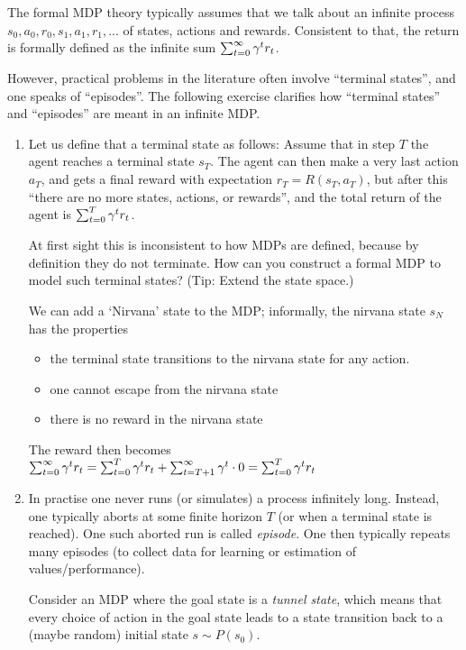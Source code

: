 The formal MDP theory typically assumes that we talk about an infinite process\\ $s_0,a_0,r_0,s_1,a_1,r_1,...$ of states, actions and rewards. Consistent to that, the return is formally defined as the infinite sum $\sum_{t=0}^\infty \gamma^t r_t$.

However, practical problems in the literature often involve ``terminal states'', and one speaks of ``episodes''. The following exercise clarifies how ``terminal states'' and ``episodes'' are meant in an infinite MDP.

\begin{enumerate}
\item Let us define that a terminal state as follows: Assume that in step $T$ the agent reaches a terminal state $s_T$. The agent can then make a very last action $a_T$, and gets a final reward with expectation $r_T = R(s_T, a_T)$, but after this ``there are no more states, actions, or rewards'', and the total return of the agent is $\sum_{t=0}^T \gamma^t r_t$.

At first sight this is inconsistent to how MDPs are defined, because by definition they do not terminate. How can you construct a formal MDP to model such terminal states? (Tip: Extend the state space.)

\begin{solution}
We can add a `Nirvana' state to the MDP; informally, the nirvana state $s_N$ has the properties
    \begin{itemize}
        \item the terminal state transitions to the nirvana state for any action.
        \item one cannot escape from the nirvana state
        \item there is no reward in the nirvana state
    \end{itemize}

    The reward then becomes $\sum_{t=0}^\infty \gamma^t r_t = \sum_{t=0}^T \gamma^t r_t + \sum_{t=T+1}^\infty \gamma^t \cdot 0 = \sum_{t=0}^T \gamma^t r_t$
\end{solution}

\item In practise one never runs (or simulates) a process infinitely long. Instead, one typically aborts at some finite horizon $T$ (or when a terminal state is reached). One such aborted run is called \emph{episode}. One then typically repeats many episodes (to collect data for learning or estimation of values/performance).

Consider an MDP where the goal state is a \emph{tunnel state}, which means that every choice of action in the goal state leads to a state transition back to a (maybe random) initial state $s\sim P(s_0)$.


\end{enumerate}
